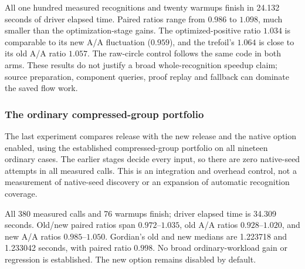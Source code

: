 \begin{center}
\small

\end{center}

All one hundred measured recognitions and twenty warmups finish in
24.132 seconds of driver elapsed time. Paired ratios range from $0.986$
to $1.098$, much smaller than the optimization-stage gains. The
optimized-positive ratio $1.034$ is comparable to its new A/A fluctuation
($0.959$), and the trefoil's $1.064$ is close to its old A/A ratio $1.057$.
The raw-circle control follows the same code in both arms. These results
do not justify a broad whole-recognition speedup claim; source preparation,
component queries, proof replay and fallback can dominate the saved flow work.

\subsubsection{The ordinary compressed-group portfolio}

The last experiment compares release  with the new release
and the native option enabled, using the established compressed-group
portfolio on all nineteen ordinary cases. The earlier stages decide every
input, so there are zero native-seed attempts in all measured calls. This
is an integration and overhead control, not a measurement of native-seed
discovery or an expansion of automatic recognition coverage.

\begin{center}
\small

\end{center}

All 380 measured calls and 76 warmups finish; driver elapsed time is
34.309 seconds. Old/new paired ratios span $0.972$--$1.035$, old A/A ratios
$0.928$--$1.020$, and new A/A ratios $0.985$--$1.050$. Gordian's old and
new medians are 1.223718 and 1.233042 seconds, with paired ratio $0.998$.
No broad ordinary-workload gain or regression is established. The new
option remains disabled by default.

